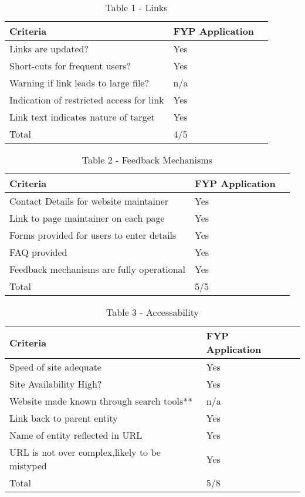 \begin{table}[H]
\caption{Table 1 - Links}
\begin{center}
    \begin{tabular}{ | l | l | p{5cm} |}
    \hline
\textbf{Criteria} & \textbf{FYP Application}\\ \hline
	Links are updated? & Yes\\ \hline
	Short-cuts for frequent users? & Yes\\ \hline
	Warning if link leads to large file? & n/a\\ \hline
	Indication of restricted access for link & Yes \\ \hline
	Link text indicates nature of target & Yes \\ \hline
	Total & 4/5 \\ \hline	
    \end{tabular}
\end{center}
\label{fig:projecttable1}
\end{table}

\begin{table}[H]
\caption{Table 2 - Feedback Mechanisms}
\begin{center}
    \begin{tabular}{ | l | l | p{5cm} |}
    \hline
\textbf{Criteria} & \textbf{FYP Application}\\ \hline
	Contact Details for website maintainer & Yes \\ \hline
	Link to page maintainer on each page & Yes \\ \hline
	Forms provided for users to enter details & Yes\\ \hline
	FAQ provided & Yes \\ \hline
	Feedback mechanisms are fully operational & Yes\\ \hline
	Total & 5/5 \\ \hline	
    \end{tabular}
\end{center}
\label{fig:projecttable2}
\end{table}

\begin{table}[H]
\caption{Table 3 - Accessability}
\begin{center}
    \begin{tabular}{ | l | l | p{5cm} |}
    \hline
\textbf{Criteria} & \textbf{FYP Application}\\ \hline
	Speed of site adequate& Yes\\ \hline
	Site Availability High? & Yes\\ \hline
	Website made known through search tools** & n/a \\ \hline
	Link back to parent entity & Yes\\ \hline	
	Name of entity reflected in URL & Yes \\ \hline	
	URL is not over complex,likely to be mistyped & Yes \\
	\hline	
	Total & 5/8\\ \hline	
    \end{tabular}
\end{center}
\label{fig:projecttable3}
\end{table}


